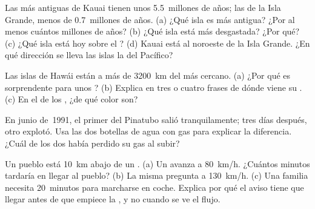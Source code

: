 \begin{exercise}[$\star\star$]\label{exo:g7:volcanoes:8}
Las  más antiguas de Kauai tienen unos 5.5~millones de años; las de la
Isla Grande, menos de 0.7~millones de años. (a) ¿Qué isla es más antigua?
¿Por al menos cuántos millones de años? (b) ¿Qué isla está más desgastada?
¿Por qué? (c) ¿Qué isla está hoy sobre el ? (d) Kauai está
al noroeste de la Isla Grande. ¿En qué dirección se lleva las islas la
 del Pacífico?
\end{exercise}

\begin{exercise}[$\star\star$]\label{exo:g7:volcanoes:9}
Las islas de Hawái están a más de \qty{3200}{km} del  más
cercano. (a) ¿Por qué es sorprendente para unos ? (b) Explica en
tres o cuatro frases de dónde viene su . (c) En el  de los
, ¿de qué color son?
\end{exercise}

\begin{exercise}[$\star\star$]\label{exo:g7:volcanoes:10}
En junio de~1991, el primer  del Pinatubo salió tranquilamente; tres
días después, otro  explotó. Usa las dos botellas de agua con gas para
explicar la diferencia. ¿Cuál de los dos  había perdido su gas al
subir?
\end{exercise}

\begin{exercise}[$\star\star\star$]\label{exo:g7:volcanoes:11}
Un pueblo está \qty{10}{km}  abajo de un . (a) Un  avanza a \qty{80}{km/h}. ¿Cuántos minutos tardaría en llegar
al pueblo? (b) La misma pregunta a \qty{130}{km/h}. (c) Una familia
necesita 20~minutos para marcharse en coche. Explica por qué el aviso tiene
que llegar antes de que empiece la , y no cuando se ve el flujo.
\end{exercise}

